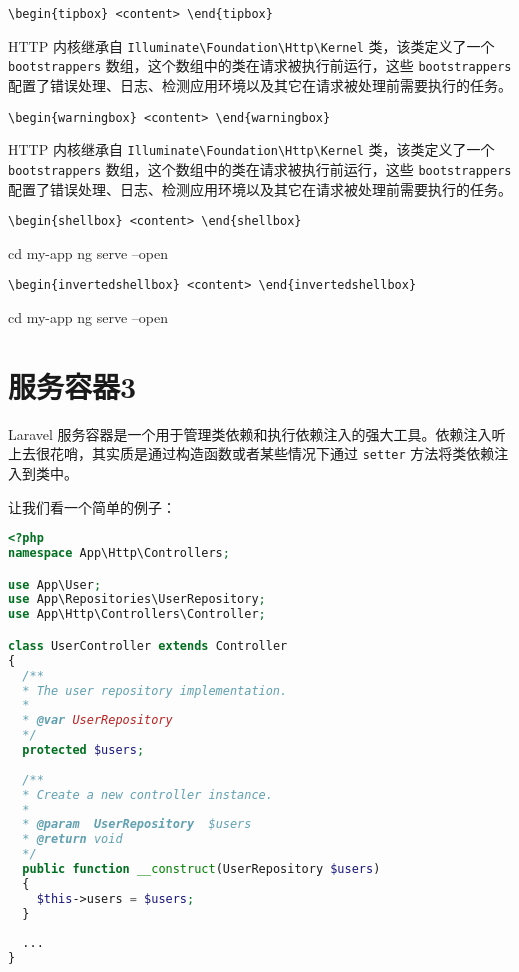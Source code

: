 \documentclass{progartcn}
\begin{document}
\noindent\verb|\begin{tipbox} <content> \end{tipbox}|

\begin{tipbox}
  HTTP 内核继承自 \verb|Illuminate\Foundation\Http\Kernel| 类，该类定义了一个 \verb|bootstrappers| 数组，这个数组中的类在请求被执行前运行，这些 \verb|bootstrappers| 配置了错误处理、日志、检测应用环境以及其它在请求被处理前需要执行的任务。
\end{tipbox}

\noindent\verb|\begin{warningbox} <content> \end{warningbox}|

\begin{warningbox}
  HTTP 内核继承自 \verb|Illuminate\Foundation\Http\Kernel| 类，该类定义了一个 \verb|bootstrappers| 数组，这个数组中的类在请求被执行前运行，这些 \verb|bootstrappers| 配置了错误处理、日志、检测应用环境以及其它在请求被处理前需要执行的任务。
\end{warningbox}

\noindent\verb|\begin{shellbox} <content> \end{shellbox}|

\begin{shellbox}
cd my-app
ng serve --open
\end{shellbox}

\noindent\verb|\begin{invertedshellbox} <content> \end{invertedshellbox}|

\begin{invertedshellbox}
cd my-app
ng serve --open
\end{invertedshellbox}


\section{服务容器3}

Laravel 服务容器是一个用于管理类依赖和执行依赖注入的强大工具。依赖注入听上去很花哨，其实质是通过构造函数或者某些情况下通过 \verb|setter| 方法将类依赖注入到类中。

让我们看一个简单的例子：

\clearpage

\begin{lstlisting}[language=PHP,caption={PHP 代码样例}]
<?php
namespace App\Http\Controllers;

use App\User;
use App\Repositories\UserRepository;
use App\Http\Controllers\Controller;

class UserController extends Controller
{
  /**
  * The user repository implementation.
  *
  * @var UserRepository
  */
  protected $users;
  
  /**
  * Create a new controller instance.
  * 
  * @param  UserRepository  $users
  * @return void
  */
  public function __construct(UserRepository $users)
  {
    $this->users = $users;
  }
  
  ...
}
\end{lstlisting}
\end{document}
